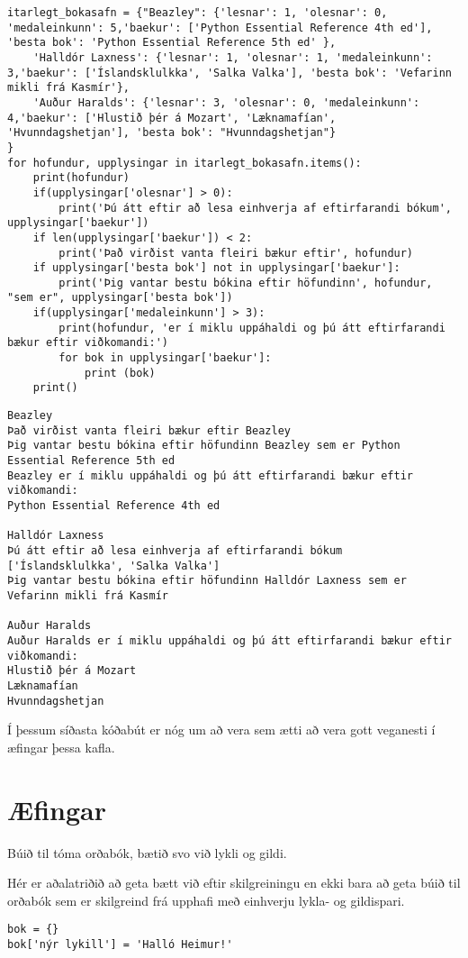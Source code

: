 \begin{lstlisting}[caption=Orðabók sem inniheldur orðabók sem gildi, label=lst:dict-dict]
itarlegt_bokasafn = {"Beazley": {'lesnar': 1, 'olesnar': 0, 'medaleinkunn': 5,'baekur': ['Python Essential Reference 4th ed'], 'besta bok': 'Python Essential Reference 5th ed' },
	'Halldór Laxness': {'lesnar': 1, 'olesnar': 1, 'medaleinkunn': 3,'baekur': ['Íslandsklulkka', 'Salka Valka'], 'besta bok': 'Vefarinn mikli frá Kasmír'}, 
	'Auður Haralds': {'lesnar': 3, 'olesnar': 0, 'medaleinkunn': 4,'baekur': ['Hlustið þér á Mozart', 'Læknamafían', 'Hvunndagshetjan'], 'besta bok': "Hvunndagshetjan"}
}
for hofundur, upplysingar in itarlegt_bokasafn.items():
	print(hofundur)
	if(upplysingar['olesnar'] > 0):
		print('Þú átt eftir að lesa einhverja af eftirfarandi bókum', upplysingar['baekur'])
	if len(upplysingar['baekur']) < 2:
		print('Það virðist vanta fleiri bækur eftir', hofundur)
	if upplysingar['besta bok'] not in upplysingar['baekur']:
		print('Þig vantar bestu bókina eftir höfundinn', hofundur, "sem er", upplysingar['besta bok'])
	if(upplysingar['medaleinkunn'] > 3):
		print(hofundur, 'er í miklu uppáhaldi og þú átt eftirfarandi bækur eftir viðkomandi:')
		for bok in upplysingar['baekur']:
			print (bok)
	print()
\end{lstlisting}
\lstset{style=uttak}
\begin{lstlisting}
Beazley
Það virðist vanta fleiri bækur eftir Beazley
Þig vantar bestu bókina eftir höfundinn Beazley sem er Python Essential Reference 5th ed
Beazley er í miklu uppáhaldi og þú átt eftirfarandi bækur eftir viðkomandi:
Python Essential Reference 4th ed

Halldór Laxness
Þú átt eftir að lesa einhverja af eftirfarandi bókum ['Íslandsklulkka', 'Salka Valka']
Þig vantar bestu bókina eftir höfundinn Halldór Laxness sem er Vefarinn mikli frá Kasmír

Auður Haralds
Auður Haralds er í miklu uppáhaldi og þú átt eftirfarandi bækur eftir viðkomandi:
Hlustið þér á Mozart
Læknamafían
Hvunndagshetjan
\end{lstlisting}
\lstset{style=venjulegt}

Í þessum síðasta kóðabút er nóg um að vera sem ætti að vera gott veganesti í æfingar þessa kafla.



\newpage
\section{Æfingar}
\begin{exercise}\label{dic1}
Búið til tóma orðabók, bætið svo við lykli og gildi.
\end{exercise}
\begin{Answer}[ref={dic1}]
Hér er aðalatriðið að geta bætt við eftir skilgreiningu en ekki bara að geta búið til orðabók sem er skilgreind frá upphafi með einhverju lykla- og gildispari.
\begin{lstlisting}
bok = {}
bok['nýr lykill'] = 'Halló Heimur!'
\end{lstlisting}
\end{Answer}

